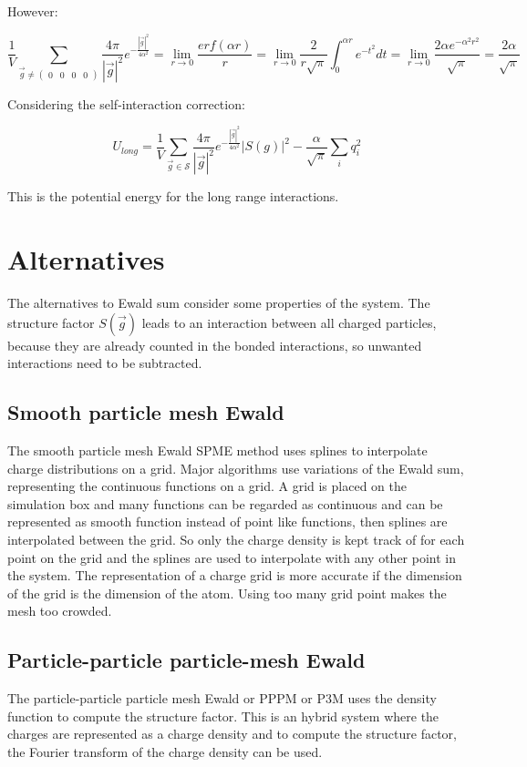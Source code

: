 	However:

	$$\frac{1}{V}\sum\limits_{\vec{g}\neq\begin{pmatrix}0&0&0&0\end{pmatrix}}\frac{4\pi}{|\vec{g}|^2}e^{-\frac{|\vec{g}|^2}{4\alpha^2}} = \lim\limits_{r\rightarrow 0}\frac{erf(\alpha r)}{r} = \lim\limits_{r\rightarrow 0}\frac{2}{r\sqrt{\pi}}\int_0^{\alpha r}e^{-t^2}dt = \lim\limits_{r\rightarrow 0}\frac{2\alpha e^{-\alpha^2r^2}}{\sqrt{\pi}} = \frac{2\alpha}{\sqrt{\pi}}$$

	Considering the self-interaction correction:

	$$U_{long} = \frac{1}{V}\sum\limits_{\vec{g}\in\mathcal{S}}\frac{4\pi}{|\vec{g}|^2}e^{-\frac{|\vec{g}|^2}{4\alpha^2}}|S(g)|^2-\frac{\alpha}{\sqrt{\pi}}\sum\limits_iq_i^2$$

	This is the potential energy for the long range interactions.

\section{Alternatives}
The alternatives to Ewald sum consider some properties of the system.
The structure factor $S(\vec{g})$ leads to an interaction between all charged particles, because they are already counted in the bonded interactions, so unwanted interactions need to be subtracted.

	\subsection{Smooth particle mesh Ewald}
	The smooth particle mesh Ewald SPME method uses splines to interpolate charge distributions on a grid.
	Major algorithms use variations of the Ewald sum, representing the continuous functions on a grid.
	A grid is placed on the simulation box and many functions can be regarded as continuous and can be represented as smooth function instead of point like functions, then splines are interpolated between the grid.
	So only the charge density is kept track of for each point on the grid and the splines are used to interpolate with any other point in the system.
	The representation of a charge grid is more accurate if the dimension of the grid is the dimension of the atom.
	Using too many grid point makes the mesh too crowded.


	\subsection{Particle-particle particle-mesh Ewald}
	The particle-particle particle mesh Ewald or PPPM or P3M uses the density function to compute the structure factor.
	This is an hybrid system where the charges are represented as a charge density and to compute the structure factor, the Fourier transform of the charge density can be used.


